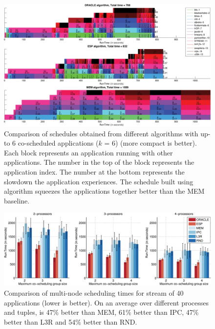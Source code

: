 \begin{figure}[t]
  \begin{center}
    \includegraphics[width=1\textwidth]{figures/scheduleCOPY.pdf}
    \caption{\small Comparison of schedules obtained from different
      algorithms with up-to 6 co-scheduled applications ($k$ = 6) (more
      compact is better). Each block represents an application running
      with other applications. The number in the top of the block
      represents the application index. The number at the bottom
      represents the slowdown the application experiences.  The
      schedule built using \SYSTEM{} algorithm squeezes the
      applications together better than the MEM baseline.}
    \label{fig:schedule2}
  \end{center}
\end{figure}
\begin{figure}[t]
\begin{center}
 \includegraphics[width=1\textwidth]{figures/parallel_schedule_combb_all_mayCOPY.pdf}
 \caption{\small Comparison of multi-node scheduling times for stream
   of 40 applications (lower is better). On an average over different
   processes and tuples, \SYSTEM{} is 47\% better than MEM, 61\%
   better than IPC, 47\% better than L3R and 54\% better than RND. }
\label{fig:expt:multi-node-all}
\end{center}
\end{figure}

